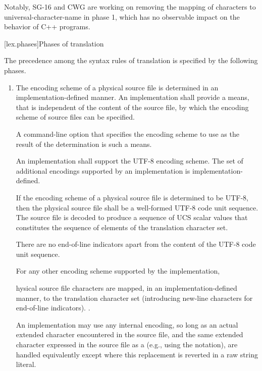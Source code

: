\documentclass{wg21}
\begin{document}
Notably, SG-16 and CWG are working on removing the mapping of characters to universal-character-name in phase 1, which has no observable impact on the behavior of C++ programs.



[lex.phases]{Phases of translation}%

\pnum
{}%
The precedence among the syntax rules of translation is specified by the
following phases.

\begin{enumerate}
    \item

\begin{addedblock}
    The encoding scheme of a physical source file is determined in an
    implementation-defined manner. An implementation shall provide a means, that is independent of the content of the source file, by
    which the encoding scheme of source files can be specified. \begin{note} A
    command-line option that specifies the encoding scheme to use as the result of
    the determination is such a means.\end{note}
     
    An implementation shall support the UTF-8 encoding scheme. The set of additional encodings supported by an implementation is implementation-defined.
    
    If the encoding scheme of a physical source file is determined to be UTF-8, then the
    physical source file shall be a well-formed UTF-8 code unit sequence. The source file is decoded
    to produce a sequence of UCS scalar values that constitutes the sequence of
    elements of the translation character set. \begin{note} There are no end-of-line
    indicators apart from the content of the UTF-8 code unit sequence. \end{note}
    
    For any other encoding scheme supported by the implementation,
\end{addedblock}hysical source file characters are mapped, in an
implementation-defined manner, to the translation character set (introducing new-line characters for end-of-line
indicators).
.

An implementation may use any internal
encoding, so long as an actual extended character encountered in the
source file, and the same extended character expressed in the source
file as a  (e.g., using the  notation), are handled equivalently except where this replacement is reverted in a raw string literal.


\end{enumerate}
\end{document}
